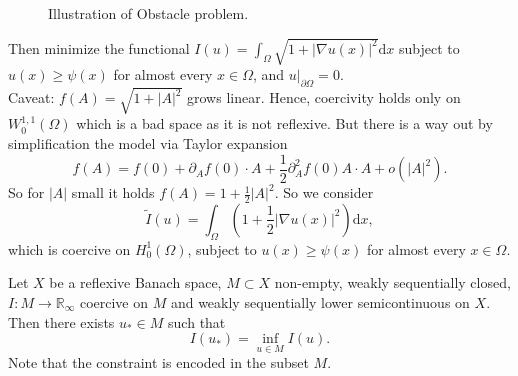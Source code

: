 \begin{example}
\begin{itemize}
	\begin{figure}[ht]
		\centering
		\caption{Illustration of Obstacle problem.}
	\end{figure}

	Then minimize the functional $I(u)=\int_\Omega{\sqrt{1+\lvert\nabla u(x)\rvert^2}\mathrm{d}x}$ subject to $u(x)\geq\psi(x)$ for almost every $x\in\Omega$, and $u\vert_{\partial\Omega}=0$.\\

	Caveat: $f(A)=\sqrt{1+\lvert A\rvert^2}$ grows linear. Hence, coercivity holds only on $W_0^{1,1}(\Omega)$ which is a bad space as it is not reflexive. But there is a way out by simplification the model via Taylor expansion
	\[f(A)=f(0)+\partial_Af(0)\cdot A+\frac{1}{2}\partial_A^2f(0)A\cdot A+o(\lvert A\rvert^2).\]
	So for $\lvert A\rvert$ small it holds $f(A)=1+\frac{1}{2}\lvert A\rvert^2$. So we consider
	\[\widetilde{I}(u)=\int_\Omega{\left(1+\frac{1}{2}\lvert\nabla u(x)\rvert^2\right)\mathrm{d}x},\]
	which is coercive on $H_0^1(\Omega)$, subject to $u(x)\geq\psi(x)$ for almost every $x\in\Omega$.\\[11pt]
\end{itemize}
\end{example}

\begin{theorem}
Let $X$ be a reflexive Banach space, $M\subset X$ non-empty, weakly sequentially closed, $I:M\longrightarrow\mathbb{R}_\infty$ coercive on $M$ and weakly sequentially lower semicontinuous on $X$. Then there exists $u_*\in M$ such that
\[I(u_*)=\inf_{u\in M}{I(u)}.\]
Note that the constraint is encoded in the subset $M$.\\
\end{theorem}

